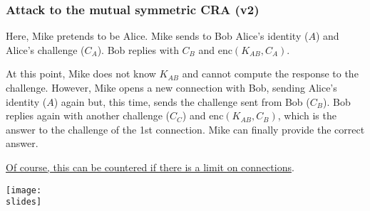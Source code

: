 \subsubsection{Attack to the mutual symmetric CRA (v2)}
\vspace*{5mm}
\noindent
\begin{minipage}{0.4\textwidth}
  Here, Mike pretends to be Alice. Mike sends to Bob Alice's identity (\(A\)) and Alice's challenge (\(C_A\)). Bob replies with \(C_B\) and \(\text{enc}(K_{AB}, C_A)\).

  At this point, Mike does not know \(K_{AB}\) and cannot compute the response to the challenge. However, Mike opens a new connection with Bob, sending Alice's identity (\(A\)) again but, this time, sends the challenge sent from Bob (\(C_B\)). Bob replies again with another challenge (\(C_C\)) and \(\text{enc}(K_{AB}, C_B)\), which is the answer to the challenge of the 1st connection. Mike can finally provide the correct answer.

  \ul{Of course, this can be countered if there is a limit on connections}.
\end{minipage}
\hspace{0.05\textwidth}
\begin{minipage}{0.5\textwidth}
  \centering
  \texttt{[image: \\slides]}
\end{minipage}

